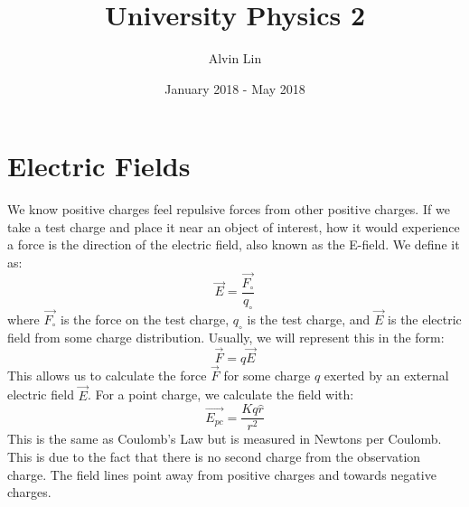 \documentclass{math}
\title{University Physics 2}
\author{Alvin Lin}
\date{January 2018 - May 2018}
\begin{document}
\maketitle

\section*{Electric Fields}
We know positive charges feel repulsive forces from other positive charges. If
we take a test charge and place it near an object of interest, how it would
experience a force is the direction of the electric field, also known as the
E-field. We define it as:
\[ \vec{E} = \frac{\vec{F_{\circ}}}{q_{\circ}} \]
where \( \vec{F_{\circ}} \) is the force on the test charge, \( q_{\circ} \)
is the test charge, and \( \vec{E} \) is the electric field from some charge
distribution. Usually, we will represent this in the form:
\[ \vec{F} = q\vec{E} \]
This allows us to calculate the force \( \vec{F} \) for some charge \( q \)
exerted by an external electric field \( \vec{E} \). For a point charge, we
calculate the field with:
\[ \vec{E_{pc}} = \frac{Kq\hat{r}}{r^2} \]
This is the same as Coulomb's Law but is measured in Newtons per Coulomb. This
is due to the fact that there is no second charge from the observation charge.
The field lines point away from positive charges and towards negative charges.
\begin{center}
\end{center}
\end{document}
